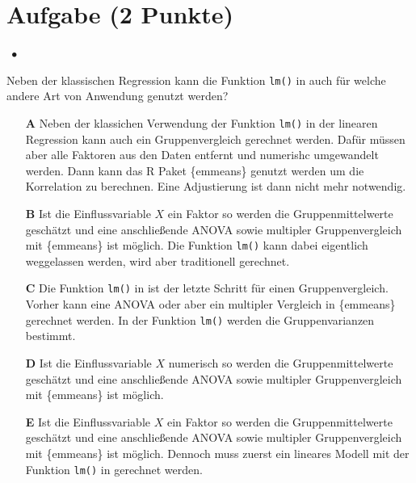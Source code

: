 \documentclass[a4paper, 9pt]{scrartcl}\usepackage[]{graphicx}\usepackage[]{xcolor}
\begin{document}
\section{Aufgabe \hfill (2 Punkte)}

\ifcollection
\begin{flushright}
\tiny\vspace{-2Ex}
\textbf{\examinhaltstart}
\exammodulestatversuch $\;\bullet$
\exammodulebiostat
\vspace{-1Ex}
\end{flushright}
\fi




Neben der klassischen Regression kann die Funktion \texttt{lm()} in \Rlogo auch für welche andere Art von Anwendung genutzt werden?





\begin{enumerate}
\item [\textbf{A} \msquare] Neben der klassichen Verwendung der Funktion \texttt{lm()} in der linearen Regression kann auch ein Gruppenvergleich gerechnet werden. Dafür müssen aber alle Faktoren aus den Daten entfernt und numerishc umgewandelt werden. Dann kann das R Paket \{emmeans\} genutzt werden um die Korrelation zu berechnen. Eine Adjustierung ist dann nicht mehr notwendig.
\item [\textbf{B} \msquare] Ist die Einflussvariable $X$ ein Faktor so werden die Gruppenmittelwerte geschätzt und eine anschließende ANOVA sowie multipler Gruppenvergleich mit \{emmeans\} ist möglich. Die Funktion \texttt{lm()} kann dabei eigentlich weggelassen werden, wird aber traditionell gerechnet.
\item [\textbf{C} \msquare] Die Funktion \texttt{lm()} in \Rlogo ist der letzte Schritt für einen Gruppenvergleich. Vorher kann eine ANOVA oder aber ein multipler Vergleich in \{emmeans\} gerechnet werden. In der Funktion  \texttt{lm()} werden die Gruppenvarianzen bestimmt.
\item [\textbf{D} \msquare] Ist die Einflussvariable $X$ numerisch so werden die Gruppenmittelwerte geschätzt und eine anschließende ANOVA sowie multipler Gruppenvergleich mit \{emmeans\} ist möglich.
\item [\textbf{E} \msquare] Ist die Einflussvariable $X$ ein Faktor so werden die Gruppenmittelwerte geschätzt und eine anschließende ANOVA sowie multipler Gruppenvergleich mit \{emmeans\} ist möglich. Dennoch muss zuerst ein lineares Modell mit der Funktion \texttt{lm()} in \Rlogo gerechnet werden.
\end{enumerate}
\end{document}
